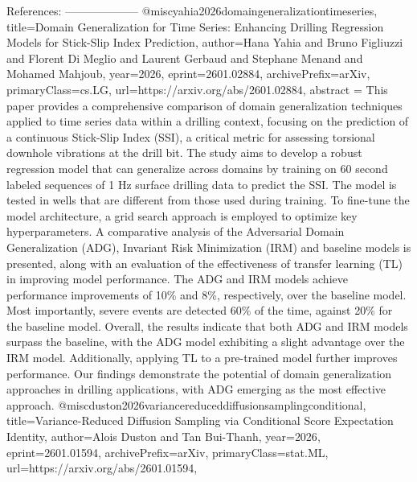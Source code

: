         References:
        --------------------
        @misc{yahia2026domaingeneralizationtimeseries,
      title={Domain Generalization for Time Series: Enhancing Drilling Regression Models for Stick-Slip Index Prediction}, 
      author={Hana Yahia and Bruno Figliuzzi and Florent Di Meglio and Laurent Gerbaud and Stephane Menand and Mohamed Mahjoub},
      year={2026},
      eprint={2601.02884},
      archivePrefix={arXiv},
      primaryClass={cs.LG},
      url={https://arxiv.org/abs/2601.02884},
      abstract = {This paper provides a comprehensive comparison of domain generalization techniques applied to time series data within a drilling context, focusing on the prediction of a continuous Stick-Slip Index (SSI), a critical metric for assessing torsional downhole vibrations at the drill bit. The study aims to develop a robust regression model that can generalize across domains by training on 60 second labeled sequences of 1 Hz surface drilling data to predict the SSI. The model is tested in wells that are different from those used during training. To fine-tune the model architecture, a grid search approach is employed to optimize key hyperparameters. A comparative analysis of the Adversarial Domain Generalization (ADG), Invariant Risk Minimization (IRM) and baseline models is presented, along with an evaluation of the effectiveness of transfer learning (TL) in improving model performance. The ADG and IRM models achieve performance improvements of 10\% and 8\%, respectively, over the baseline model. Most importantly, severe events are detected 60\% of the time, against 20\% for the baseline model. Overall, the results indicate that both ADG and IRM models surpass the baseline, with the ADG model exhibiting a slight advantage over the IRM model. Additionally, applying TL to a pre-trained model further improves performance. Our findings demonstrate the potential of domain generalization approaches in drilling applications, with ADG emerging as the most effective approach.}
}@misc{duston2026variancereduceddiffusionsamplingconditional,
      title={Variance-Reduced Diffusion Sampling via Conditional Score Expectation Identity}, 
      author={Alois Duston and Tan Bui-Thanh},
      year={2026},
      eprint={2601.01594},
      archivePrefix={arXiv},
      primaryClass={stat.ML},
      url={https://arxiv.org/abs/2601.01594},
}
